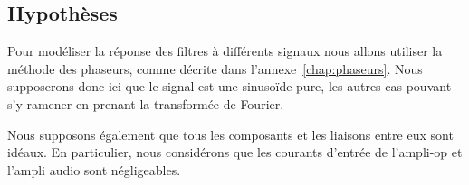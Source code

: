 \subsection{Hypothèses}

Pour modéliser la réponse des filtres à différents signaux nous allons utiliser
la méthode des phaseurs, comme décrite dans l'annexe~\ref{chap:phaseurs}.
Nous supposerons donc ici que le signal est une sinusoïde pure, les autres cas
pouvant s'y ramener en prenant la transformée de Fourier.

Nous supposons également que tous les composants et les liaisons entre eux
sont idéaux.
En particulier, nous considérons que les courants d'entrée de l'ampli-op
et l'ampli audio sont négligeables.
